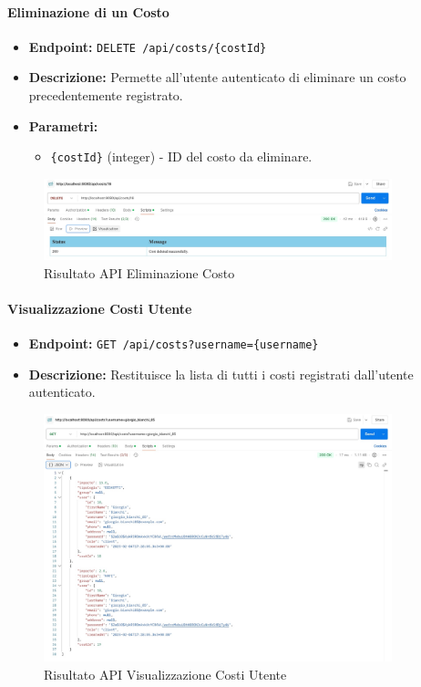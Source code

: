 \paragraph{Eliminazione di un Costo}  

\begin{itemize}
    \item \textbf{Endpoint:} \texttt{DELETE /api/costs/\{costId\}}
    \item \textbf{Descrizione:} Permette all'utente autenticato di eliminare un costo precedentemente registrato.
    \item \textbf{Parametri:}
    \begin{itemize}
        \item \texttt{\{costId\}} (integer) - ID del costo da eliminare.
    \end{itemize}
\end{itemize}

\begin{figure}[h!]
    \centering
    \includegraphics[width=0.9\textwidth]{images/deleteCost.jpeg}
    \caption{Risultato API Eliminazione Costo}
    \label{fig:api_delete_cost}
\end{figure}

\paragraph{Visualizzazione Costi Utente}  

\begin{itemize}
    \item \textbf{Endpoint:} \texttt{GET /api/costs?username=\{username\}}
    \item \textbf{Descrizione:} Restituisce la lista di tutti i costi registrati dall'utente autenticato.
\end{itemize}

\begin{figure}[h!]
    \centering
    \includegraphics[width=0.9\textwidth]{images/getUserCosts.jpeg}
    \caption{Risultato API Visualizzazione Costi Utente}
    \label{fig:api_view_user_costs}
\end{figure}

